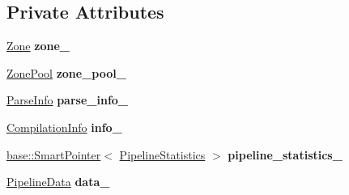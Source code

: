 \subsection*{Private Attributes}
\begin{DoxyCompactItemize}
\item 
\hyperlink{classv8_1_1internal_1_1_zone}{Zone} {\bfseries zone\+\_\+}\hypertarget{classv8_1_1internal_1_1compiler_1_1_pipeline_compilation_job_a53e60cbec14946bcde27f817f9773e47}{}\label{classv8_1_1internal_1_1compiler_1_1_pipeline_compilation_job_a53e60cbec14946bcde27f817f9773e47}

\item 
\hyperlink{classv8_1_1internal_1_1compiler_1_1_zone_pool}{Zone\+Pool} {\bfseries zone\+\_\+pool\+\_\+}\hypertarget{classv8_1_1internal_1_1compiler_1_1_pipeline_compilation_job_a2ca225a66abb269d23f7df3bd6f46631}{}\label{classv8_1_1internal_1_1compiler_1_1_pipeline_compilation_job_a2ca225a66abb269d23f7df3bd6f46631}

\item 
\hyperlink{classv8_1_1internal_1_1_parse_info}{Parse\+Info} {\bfseries parse\+\_\+info\+\_\+}\hypertarget{classv8_1_1internal_1_1compiler_1_1_pipeline_compilation_job_ad1cb0cf31c404a790614d84079d3df41}{}\label{classv8_1_1internal_1_1compiler_1_1_pipeline_compilation_job_ad1cb0cf31c404a790614d84079d3df41}

\item 
\hyperlink{classv8_1_1internal_1_1_compilation_info}{Compilation\+Info} {\bfseries info\+\_\+}\hypertarget{classv8_1_1internal_1_1compiler_1_1_pipeline_compilation_job_a7349acd617377d193862b20ad4c21457}{}\label{classv8_1_1internal_1_1compiler_1_1_pipeline_compilation_job_a7349acd617377d193862b20ad4c21457}

\item 
\hyperlink{classv8_1_1base_1_1_smart_pointer}{base\+::\+Smart\+Pointer}$<$ \hyperlink{classv8_1_1internal_1_1compiler_1_1_pipeline_statistics}{Pipeline\+Statistics} $>$ {\bfseries pipeline\+\_\+statistics\+\_\+}\hypertarget{classv8_1_1internal_1_1compiler_1_1_pipeline_compilation_job_af4f669230a23794d87e40bffb209a3d3}{}\label{classv8_1_1internal_1_1compiler_1_1_pipeline_compilation_job_af4f669230a23794d87e40bffb209a3d3}

\item 
\hyperlink{classv8_1_1internal_1_1compiler_1_1_pipeline_data}{Pipeline\+Data} {\bfseries data\+\_\+}\hypertarget{classv8_1_1internal_1_1compiler_1_1_pipeline_compilation_job_a6db9f030d1e9b2c3ec4929ab7d045578}{}\label{classv8_1_1internal_1_1compiler_1_1_pipeline_compilation_job_a6db9f030d1e9b2c3ec4929ab7d045578}


\end{DoxyCompactItemize}
